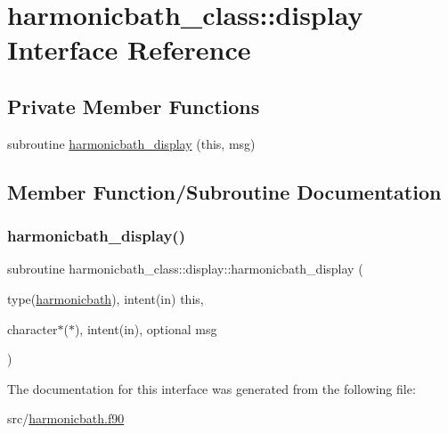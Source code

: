 \hypertarget{interfaceharmonicbath__class_1_1display}{}\section{harmonicbath\+\_\+class\+:\+:display Interface Reference}
\label{interfaceharmonicbath__class_1_1display}
\subsection*{Private Member Functions}
\begin{DoxyCompactItemize}
\item 
subroutine \hyperlink{interfaceharmonicbath__class_1_1display_ac470b2ebb72ec1bc947b5874a9cc2155}{harmonicbath\+\_\+display} (this, msg)
\end{DoxyCompactItemize}


\subsection{Member Function/\+Subroutine Documentation}
\mbox{\label{interfaceharmonicbath__class_1_1display_ac470b2ebb72ec1bc947b5874a9cc2155}} 
\subsubsection{\texorpdfstring{harmonicbath\+\_\+display()}{harmonicbath\_display()}}
{\footnotesize\ttfamily subroutine harmonicbath\+\_\+class\+::display\+::harmonicbath\+\_\+display (\begin{DoxyParamCaption}\item[{type(\hyperlink{structharmonicbath__class_1_1harmonicbath}{harmonicbath}), intent(in)}]{this,  }\item[{character$\ast$($\ast$), intent(in), optional}]{msg }\end{DoxyParamCaption})\hspace{0.3cm}{\ttfamily [private]}}



The documentation for this interface was generated from the following file\+:\begin{DoxyCompactItemize}
\item 
src/\hyperlink{harmonicbath_8f90}{harmonicbath.\+f90}\end{DoxyCompactItemize}
